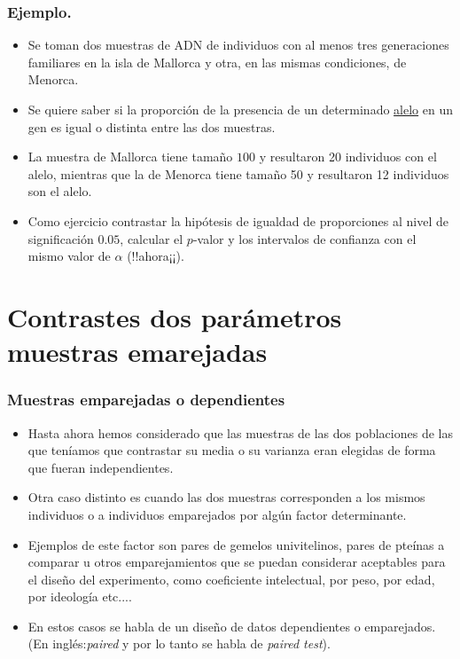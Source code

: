 \begin{frame}
\frametitle{Ejemplo.}
\begin{itemize}
\item Se toman dos muestras de ADN de individuos con al menos tres  generaciones familiares en la isla de Mallorca y otra, en las mismas condiciones, de Menorca.
\item  Se quiere saber si la proporción de la presencia de un determinado \href{http://es.wikipedia.org/wiki/Alelo}{alelo} en un gen es igual o distinta entre las dos muestras.
\item  La muestra de Mallorca tiene tamaño $100$ y resultaron 20 individuos con el alelo, mientras que la de Menorca tiene tamaño 50  y resultaron 12 individuos son el alelo.
\item Como ejercicio contrastar la hipótesis de igualdad de proporciones al nivel de significación $0.05$, calcular el $p$-valor y los intervalos de confianza con el mismo  valor de $\alpha$ (!!ahora¡¡).
\end{itemize}
\end{frame}

\section{Contrastes dos parámetros  muestras emarejadas}
\begin{frame}
\frametitle{Muestras emparejadas o dependientes}
\begin{itemize}
\item Hasta ahora hemos considerado que las muestras de las dos poblaciones de las que teníamos que contrastar su media o su varianza eran elegidas de forma que fueran independientes.
\item Otra caso distinto es cuando las dos muestras corresponden a los mismos individuos o a individuos emparejados por algún factor  determinante.
\item  Ejemplos de este factor  son pares de gemelos univitelinos, pares de pteínas a comparar u otros emparejamientos que se puedan considerar aceptables para el diseño del experimento, como coeficiente intelectual, por peso, por edad, por ideología etc....
\item En estos casos se habla de un diseño de datos dependientes o emparejados. (En inglés:\textsl{paired} y por lo tanto se habla de \textsl{paired test}).
\end{itemize}
\end{frame}

